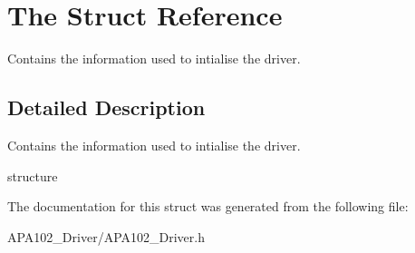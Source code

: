 \hypertarget{structThe}{}\section{The Struct Reference}
\label{structThe}


Contains the information used to intialise the driver.  




\subsection{Detailed Description}
Contains the information used to intialise the driver. 

structure 

The documentation for this struct was generated from the following file\+:\begin{DoxyCompactItemize}
\item 
A\+P\+A102\+\_\+\+Driver/A\+P\+A102\+\_\+\+Driver.\+h\end{DoxyCompactItemize}
